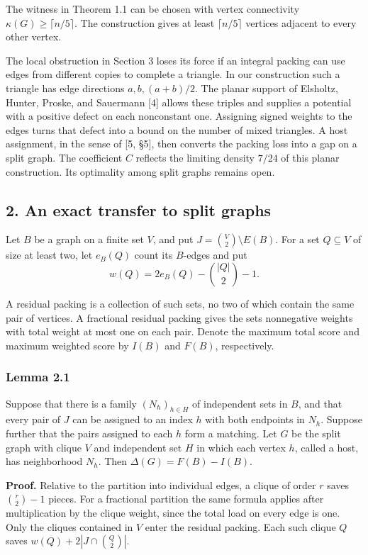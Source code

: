 \documentclass[english,11pt,a4paper]{article}
\begin{document}
The witness in Theorem 1.1 can be chosen with vertex connectivity \(\kappa(G)\ge\lceil n/5\rceil\). The construction gives at least \(\lceil n/5\rceil\) vertices adjacent to every other vertex.

The local obstruction in Section 3 loses its force if an integral packing can use edges from different copies to complete a triangle. In our construction such a triangle has edge directions \(a,b,(a+b)/2\). The planar support of Elsholtz, Hunter, Proske, and Sauermann {[}4{]} allows these triples and supplies a potential with a positive defect on each nonconstant one. Assigning signed weights to the edges turns that defect into a bound on the number of mixed triangles. A host assignment, in the sense of {[}5, §5{]}, then converts the packing loss into a gap on a split graph. The coefficient \(C\) reflects the limiting density \(7/24\) of this planar construction. Its optimality among split graphs remains open.

\subsection{2. An exact transfer to split graphs}\label{an-exact-transfer-to-split-graphs}

Let \(B\) be a graph on a finite set \(V\), and put \(J=\binom V2\setminus E(B)\). For a set \(Q\subseteq V\) of size at least two, let \(e_B(Q)\) count its \(B\)-edges and put
\[w(Q)=2e_B(Q)-\binom{|Q|}{2}-1.\]

A residual packing is a collection of such sets, no two of which contain the same pair of vertices. A fractional residual packing gives the sets nonnegative weights with total weight at most one on each pair. Denote the maximum total score and maximum weighted score by \(I(B)\) and \(F(B)\), respectively.

\subsubsection{Lemma 2.1}\label{lemma-2.1}

Suppose that there is a family \((N_h)_{h\in H}\) of independent sets in \(B\), and that every pair of \(J\) can be assigned to an index \(h\) with both endpoints in \(N_h\). Suppose further that the pairs assigned to each \(h\) form a matching. Let \(G\) be the split graph with clique \(V\) and independent set \(H\) in which each vertex \(h\), called a host, has neighborhood \(N_h\). Then \(\Delta(G)=F(B)-I(B)\).

\textbf{Proof.} Relative to the partition into individual edges, a clique of order \(r\) saves \(\binom r2-1\) pieces. For a fractional partition the same formula applies after multiplication by the clique weight, since the total load on every edge is one. Only the cliques contained in \(V\) enter the residual packing. Each such clique \(Q\) saves \(w(Q)+2|J\cap\binom Q2|\).
\end{document}
